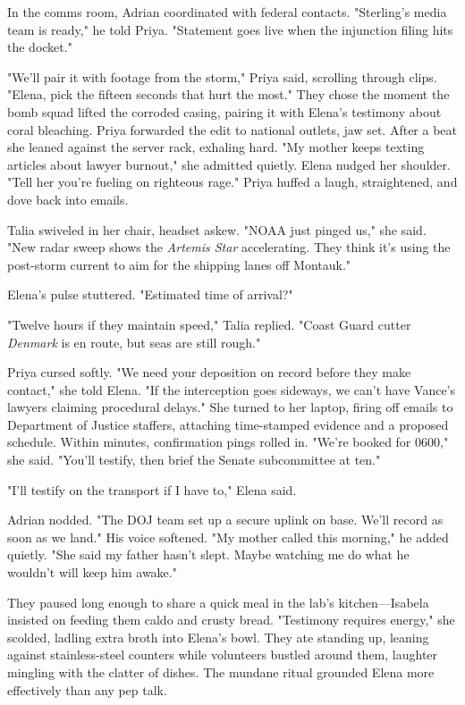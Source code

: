 In the comms room, Adrian coordinated with federal contacts. "Sterling's media team is ready," he told Priya. "Statement goes live when the injunction filing hits the docket."

"We'll pair it with footage from the storm," Priya said, scrolling through clips. "Elena, pick the fifteen seconds that hurt the most." They chose the moment the bomb squad lifted the corroded casing, pairing it with Elena's testimony about coral bleaching. Priya forwarded the edit to national outlets, jaw set. After a beat she leaned against the server rack, exhaling hard. "My mother keeps texting articles about lawyer burnout," she admitted quietly. Elena nudged her shoulder. "Tell her you're fueling on righteous rage." Priya huffed a laugh, straightened, and dove back into emails.

Talia swiveled in her chair, headset askew. "NOAA just pinged us," she said. "New radar sweep shows the \textit{Artemis Star} accelerating. They think it's using the post-storm current to aim for the shipping lanes off Montauk."

Elena's pulse stuttered. "Estimated time of arrival?"

"Twelve hours if they maintain speed," Talia replied. "Coast Guard cutter \textit{Denmark} is en route, but seas are still rough."

Priya cursed softly. "We need your deposition on record before they make contact," she told Elena. "If the interception goes sideways, we can't have Vance's lawyers claiming procedural delays." She turned to her laptop, firing off emails to Department of Justice staffers, attaching time-stamped evidence and a proposed schedule. Within minutes, confirmation pings rolled in. "We're booked for 0600," she said. "You'll testify, then brief the Senate subcommittee at ten."

"I'll testify on the transport if I have to," Elena said.

Adrian nodded. "The DOJ team set up a secure uplink on base. We'll record as soon as we land." His voice softened. "My mother called this morning," he added quietly. "She said my father hasn't slept. Maybe watching me do what he wouldn't will keep him awake."

They paused long enough to share a quick meal in the lab's kitchen—Isabela insisted on feeding them caldo and crusty bread. "Testimony requires energy," she scolded, ladling extra broth into Elena's bowl. They ate standing up, leaning against stainless-steel counters while volunteers bustled around them, laughter mingling with the clatter of dishes. The mundane ritual grounded Elena more effectively than any pep talk.

